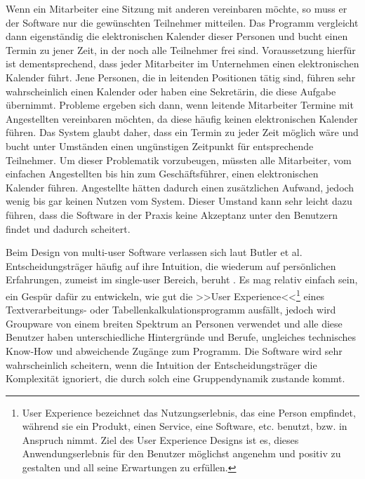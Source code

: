 Wenn ein Mitarbeiter eine Sitzung mit anderen vereinbaren möchte, so muss er der Software nur die gewünschten Teilnehmer mitteilen. Das Programm vergleicht dann eigenständig die elektronischen Kalender dieser Personen und bucht einen Termin zu jener Zeit, in der noch alle Teilnehmer frei sind. Voraussetzung hierfür ist dementsprechend, dass jeder Mitarbeiter im Unternehmen einen elektronischen Kalender führt. Jene Personen, die in leitenden Positionen tätig sind, führen sehr wahrscheinlich einen Kalender oder haben eine Sekretärin, die diese Aufgabe übernimmt. Probleme ergeben sich dann, wenn leitende Mitarbeiter Termine mit Angestellten vereinbaren möchten, da diese häufig keinen elektronischen Kalender führen. Das System glaubt daher, dass ein Termin zu jeder Zeit möglich wäre und bucht unter Umständen einen ungünstigen Zeitpunkt für entsprechende Teilnehmer.  Um dieser Problematik vorzubeugen, müssten alle Mitarbeiter, vom einfachen Angestellten bis hin zum Geschäftsführer, einen elektronischen Kalender führen. Angestellte hätten dadurch einen zusätzlichen Aufwand, jedoch wenig bis gar keinen Nutzen vom System. Dieser Umstand kann sehr leicht dazu führen, dass die Software in der Praxis keine Akzeptanz unter den Benutzern findet und dadurch scheitert.

\medskip Beim Design von multi-user Software verlassen sich laut Butler et al. Entscheidungsträger häufig auf ihre Intuition, die wiederum auf persönlichen Erfahrungen, zumeist im single-user Bereich, beruht \citep{ButlerK:1987}. Es mag relativ einfach sein, ein Gespür dafür zu entwickeln, wie gut die >>User Experience<<\footnote{User Experience bezeichnet das Nutzungserlebnis, das eine Person empfindet, während sie ein Produkt, einen Service, eine Software, etc. benutzt, bzw. in Anspruch nimmt. Ziel des User Experience Designs ist es, dieses Anwendungserlebnis für den Benutzer möglichst angenehm und positiv zu gestalten und all seine Erwartungen zu erfüllen.} eines Textverarbeitungs- oder Tabellenkalkulationsprogramm ausfällt, jedoch wird Groupware von einem breiten Spektrum an Personen verwendet und alle diese Benutzer haben unterschiedliche Hintergründe und Berufe, ungleiches technisches Know-How und abweichende Zugänge zum Programm. Die Software wird sehr wahrscheinlich scheitern, wenn die Intuition der Entscheidungsträger die Komplexität ignoriert, die durch solch eine Gruppendynamik zustande kommt. 

